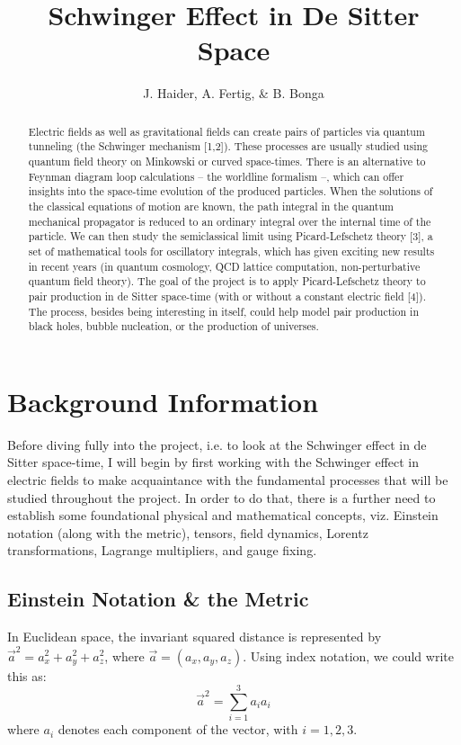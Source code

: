 \documentclass{emulateapj}
\begin{document}
\title{Schwinger Effect in De Sitter Space}

\author{J. Haider, A. Fertig, \& B. Bonga}




\begin{abstract}
Electric fields as well as gravitational fields can create pairs of particles via quantum tunneling (the Schwinger mechanism [1,2]). These processes are usually studied using quantum field theory on Minkowski or curved space-times. There is an alternative to Feynman diagram loop calculations -- the worldline formalism --, which can offer insights into the space-time evolution of the produced particles.
When the solutions of the classical equations of motion are known, the path integral in the quantum mechanical propagator is reduced to an ordinary integral over the internal time of the particle. We can then study the semiclassical limit using Picard-Lefschetz theory [3], a set of mathematical tools for oscillatory integrals, which has given exciting new results in recent years (in quantum cosmology, QCD lattice computation, non-perturbative quantum field theory). 
The goal of the project is to apply Picard-Lefschetz theory to pair production in de Sitter space-time (with or without a constant electric field [4]). The process, besides being interesting in itself, could help model pair production in black holes, bubble nucleation, or the production of universes.

\end{abstract}

\section{Background Information} \label{background}
Before diving fully into the project, i.e. to look at the Schwinger effect in de Sitter space-time, I will begin by first working with the Schwinger effect in electric fields to make acquaintance with the fundamental processes that will be studied throughout the project. In order to do that, there is a further need to establish some foundational physical and mathematical concepts, viz. Einstein notation (along with the metric), tensors, field dynamics, Lorentz transformations, Lagrange multipliers, and gauge fixing.

\subsection{Einstein Notation \& the Metric} \label{einstein}
In Euclidean space, the invariant squared distance is represented by $\vec{a}^2=a_x^2 + a_y^2 + a_z^2$, where $\vec{a}=(a_x,a_y,a_z)$. Using index notation, we could write this as:
\[ \vec{a}^2 = \sum_{i=1}^{3} a_ia_i\]
where $a_i$ denotes each component of the vector, with $i=1,2,3$.
\end{document}
